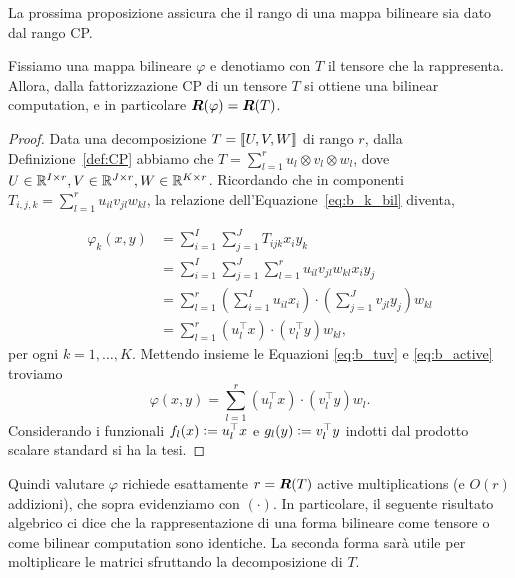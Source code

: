 La prossima proposizione assicura che il rango di una mappa bilineare sia dato dal rango CP.
\begin{proposition}
	Fissiamo una mappa bilineare $ \varphi $ e denotiamo con $ T $ il tensore che la rappresenta. Allora, dalla
	fattorizzazione CP di un tensore $ T $ si ottiene una bilinear computation, e in particolare $
		\bm{R}(\varphi) = \bm{R}(T) $.
\end{proposition}
\begin{proof}
	Data una decomposizione $ T = \dsqr{U,V,W} $ di rango $ r $, dalla Definizione~\ref{def:CP}
	abbiamo che $ T = \sum_{l=1}^r u_l \otimes v_l \otimes w_l $, dove $ U \in \mathbb{R}^{I \times r}, V \in
		\mathbb{R}^{J \times r}, W \in \mathbb{R}^{K \times r}$. Ricordando che in componenti $ T_{i,j,k} =
		\sum_{l=1}^r u_{il}v_{jl}w_{kl} $, la relazione dell'Equazione~\eqref{eq:b_k_bil} diventa,

	\begin{equation}
		\label{eq:b_active}
		\begin{aligned}
			\varphi_k(x,y) & = \sum_{i=1}^I \sum_{j = 1}^J T_{ijk} x_{i}y_{k}        \\
			               & =
			\sum_{i=1}^I \sum_{j=1}^J \sum_{l=1}^r u_{il}v_{jl}w_{kl} x_i y_j        \\
			               & = \sum_{l=1}^r \left(\sum_{i=1}^I
			u_{il} x_i \right) \cdot \left( \sum_{j=1}^J v_{jl} y_j  \right)  w_{kl} \\
			               & = \sum_{l=1}^r
			(u_l^{\top}x) \cdot (v_l^{\top}y)w_{kl},
		\end{aligned}
	\end{equation}
	per ogni $ k = 1, \ldots, K $.
	Mettendo insieme le Equazioni \eqref{eq:b_tuv} e \eqref{eq:b_active} troviamo
	\begin{equation}
		\label{eq:lowrank_bilinear}
		\varphi(x,y) = \sum_{l=1}^r (u_l^{\top}x)\cdot(v_l^{\top}y)w_l.
	\end{equation}
	Considerando i funzionali $ f_{l}(x) \vcentcolon= u_{l}^{\top}x $ e $ g_{l}(y) \vcentcolon= v_{l}^{\top}y $
	indotti dal prodotto scalare standard si ha la tesi.

\end{proof}
Quindi valutare $ \varphi $ richiede esattamente $ r = \bm{R}(T) $ active multiplications (e $
	O(r) $ addizioni), che sopra evidenziamo con $
	(\cdot) $.
In particolare, il seguente risultato algebrico ci dice che la rappresentazione di una forma
bilineare come tensore o come bilinear computation sono identiche. La seconda forma sarà utile per
moltiplicare le matrici sfruttando la decomposizione di $ T $.
